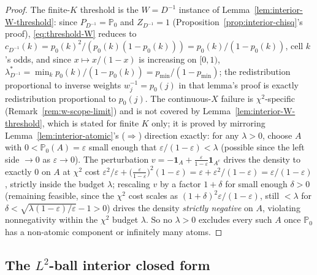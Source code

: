 \documentclass[11pt]{article}
\theoremstyle{plain}
\theoremstyle{definition}
\theoremstyle{remark}
\newcommand{\PP}{\mathbb{P}}
\begin{document}
\begin{proof}
The finite-$K$ threshold is the $W=D^{-1}$ instance of
Lemma~\ref{lem:interior-W-threshold}: since $P_{D^{-1}}=\PP_0$ and $Z_{D^{-1}}=1$
(Proposition~\ref{prop:interior-chisq}'s proof), \eqref{eq:threshold-W} reduces to
$c_{D^{-1}}(k)=p_0(k)^2/(p_0(k)(1-p_0(k)))=p_0(k)/(1-p_0(k))$, cell $k$'s odds, and
since $x\mapsto x/(1-x)$ is increasing on $[0,1)$,
$\lambda^*_{D^{-1}}=\min_kp_0(k)/(1-p_0(k))=p_{\min}/(1-p_{\min})$; the redistribution
proportional to inverse weights $w_j^{-1}=p_0(j)$ in that lemma's proof is exactly
redistribution proportional to $p_0(j)$. The continuous-$X$ failure is $\chi^2$-specific
(Remark~\ref{rem:w-scope-limit}) and is not covered by Lemma~\ref{lem:interior-W-threshold},
which is stated for finite $K$ only; it is proved by mirroring
Lemma~\ref{lem:interior-atomic}'s ($\Rightarrow$) direction exactly: for any
$\lambda>0$, choose $A$ with $0<\PP_0(A)=\varepsilon$ small enough that
$\varepsilon/(1-\varepsilon)<\lambda$ (possible since the left side $\to0$ as
$\varepsilon\to0$). The perturbation $v=-\mathbf1_A+\frac\varepsilon{1-\varepsilon}\mathbf1_{A^c}$
drives the density to exactly $0$ on $A$ at $\chi^2$ cost
$\varepsilon^2/\varepsilon+\big(\frac\varepsilon{1-\varepsilon}\big)^2(1-\varepsilon)=\varepsilon+\varepsilon^2/(1-\varepsilon)
=\varepsilon/(1-\varepsilon)$, strictly inside the budget $\lambda$; rescaling $v$ by a factor
$1+\delta$ for small enough $\delta>0$ (remaining feasible, since the $\chi^2$ cost
scales as $(1+\delta)^2\varepsilon/(1-\varepsilon)$, still $<\lambda$ for
$\delta<\sqrt{\lambda(1-\varepsilon)/\varepsilon}-1>0$) drives the density \emph{strictly
negative} on $A$, violating nonnegativity within the $\chi^2$ budget $\lambda$. So
no $\lambda>0$ excludes every such $A$ once $\PP_0$ has a non-atomic component or
infinitely many atoms.
\end{proof}


\subsection{The $L^2$-ball interior closed form}
\end{document}
